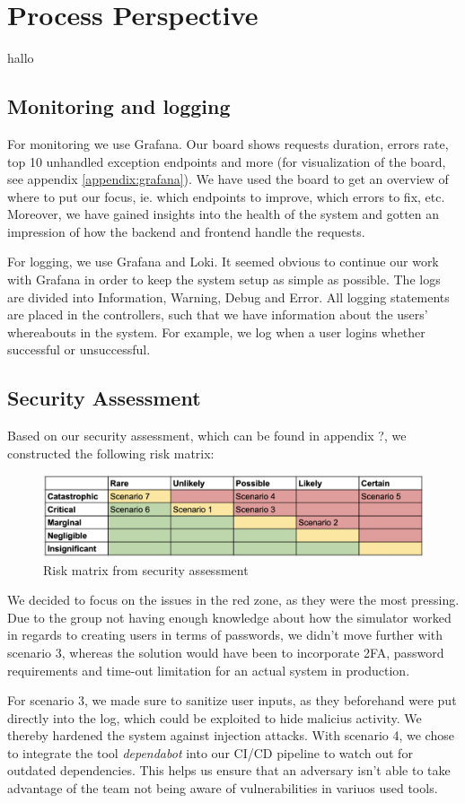 \section{Process Perspective}
hallo \cite{devopshandbook}
\subsection{Monitoring and logging}
For monitoring we use Grafana. Our board shows requests duration, errors rate, top 10 unhandled exception endpoints and more (for visualization of the board, see appendix \ref{appendix:grafana}). We have used the board to get an overview of where to put our focus, ie. which endpoints to improve, which errors to fix, etc. Moreover, we have gained insights into the health of the system and gotten an impression of how the backend and frontend handle the requests.

For logging, we use Grafana and Loki. It seemed obvious to continue our work with Grafana in order to keep the system setup as simple as possible. The logs are divided into Information, Warning, Debug and Error. All logging statements are placed in the controllers, such that we have information about the users' whereabouts in the system. For example, we log when a user logins whether successful or unsuccessful.
\subsection{Security Assessment}
Based on our security assessment, which can be found in appendix ?, we constructed the following risk matrix:
\begin{figure}[H]
    \centering
    \includegraphics[width=0.7\linewidth]{images/risk-matrix.png}
    \caption{Risk matrix from security assessment}
    \label{fig:enter-label}
\end{figure}
We decided to focus on the issues in the red zone, as they were the most pressing. Due to the group not having enough knowledge about how the simulator worked in regards to creating users in terms of passwords, we didn't move further with scenario 3, whereas the solution would have been to incorporate 2FA, password requirements and time-out limitation for an actual system in production.

For scenario 3, we made sure to sanitize user inputs, as they beforehand were put directly into the log, which could be exploited to hide malicius activity. We thereby hardened the system against injection attacks.
With scenario 4, we chose to integrate the tool \textit{dependabot} into our CI/CD pipeline to watch out for outdated dependencies. This helps us ensure that an adversary isn't able to take advantage of the team not being aware of vulnerabilities in variuos used tools.

